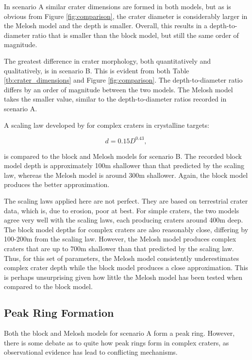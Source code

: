 In scenario A similar crater dimensions are formed in both models, but as is obvious from Figure \ref{fig:comparison}, the crater diameter is considerably larger in the Melosh model and the depth is smaller. Overall, this results in a depth-to-diameter ratio that is smaller than the block model, but still the same order of magnitude.

The greatest difference in crater morphology, both quantitatively and qualitatively, is in scenario B. This is evident from both Table \ref{tb:crater_dimensions} and Figure \ref{fig:comparison}. The depth-to-diameter ratio differs by an order of magnitude between the two models. The Melosh model takes the smaller value, similar to the depth-to-diameter ratios recorded in scenario A.

A scaling law developed by \citet{grieve1992terrestrial} for complex craters in crystalline targets:

\vspace{-0.2cm}
\begin{equation}\label{eq:complex_scaling}
d=0.15 D^{0.43},
\end{equation}

is compared to the block and Melosh models for scenario B. The recorded block model depth is approximately 100m shallower than that predicted by the scaling law, whereas the Melosh model is around 300m shallower. Again, the block model produces the better approximation.

The scaling laws applied here are not perfect. They are based on terrestrial crater data, which is, due to erosion, poor at best. For simple craters, the two models agree very well with the scaling laws, each producing craters around 400m deep. The block model depths for complex craters are also reasonably close, differing by 100-200m from the scaling law. However, the Melosh model produces complex craters that are up to 700m shallower than that predicted by the scaling law. Thus, for this set of parameters, the Melosh model consistently underestimates complex crater depth while the block model produces a close approximation. This is perhaps unsurprising given how little the Melosh model has been tested when compared to the block model.

\subsection{Peak Ring Formation}

Both the block and Melosh models for scenario A form a peak ring. However, there is some debate as to quite how peak rings form in complex craters, as observational evidence has lead to conflicting mechanisms. 

